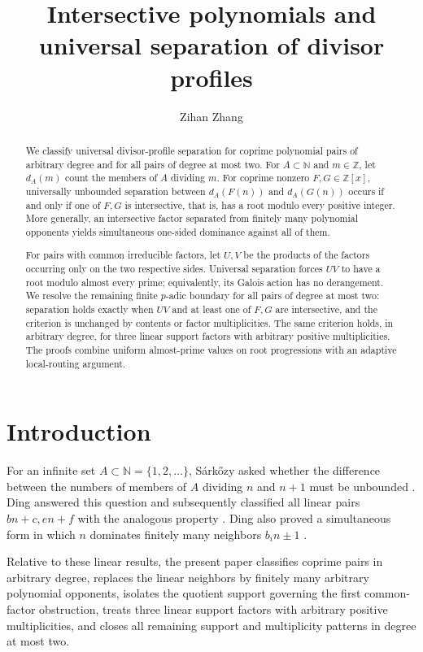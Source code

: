 \documentclass[11pt]{amsart}
\title[Universal separation of divisor profiles]{Intersective polynomials
and universal separation of divisor profiles}
\author{Zihan Zhang}
\newcommand{\N}{\mathbb N}
\newcommand{\Z}{\mathbb Z}
\theoremstyle{definition}
\begin{document}
\begin{abstract}
We classify universal divisor-profile separation for coprime polynomial pairs
of arbitrary degree and for all pairs of degree at most two.  For
\(A\subset\N\) and \(m\in\Z\), let \(d_A(m)\) count the members of \(A\)
dividing \(m\).  For coprime nonzero \(F,G\in\Z[x]\), universally unbounded
separation between \(d_A(F(n))\) and \(d_A(G(n))\) occurs if and only if one
of \(F,G\) is intersective, that is, has a root modulo every positive integer.
More generally, an intersective factor separated from finitely many polynomial
opponents yields simultaneous one-sided dominance against all of them.

For pairs with common irreducible factors, let \(U,V\) be the products of
the factors occurring only on the two respective sides.  Universal
separation forces \(UV\) to have a root modulo almost every prime;
equivalently, its Galois action has no derangement.  We resolve the remaining
finite \(p\)-adic boundary for all pairs of degree at most two: separation
holds exactly when \(UV\) and at least one of \(F,G\) are intersective, and
the criterion is unchanged by contents or factor multiplicities.  The same
criterion holds, in arbitrary degree, for three linear support factors with
arbitrary positive multiplicities.  The proofs combine uniform almost-prime
values on root progressions with an adaptive local-routing argument.
\end{abstract}

\maketitle

\section{Introduction}

For an infinite set \(A\subset\N=\{1,2,\ldots\}\), S\'ark\H{o}zy asked
whether the difference between the numbers of members of \(A\) dividing
\(n\) and \(n+1\) must be unbounded
\cite{Sarkozy2001}.  Ding answered this question and subsequently classified
all linear pairs \(bn+c,en+f\) with the analogous property
\cite{DingLinear}.  Ding also proved a simultaneous form in which \(n\)
dominates finitely many neighbors \(b_i n\pm1\)
\cite{DingProblem26}.

Relative to these linear results, the present paper classifies coprime pairs
in arbitrary degree, replaces the linear neighbors by finitely many arbitrary
polynomial opponents, isolates the quotient support governing the first
common-factor obstruction, treats three linear support factors with arbitrary
positive multiplicities, and closes all remaining support and multiplicity
patterns in degree at most two.
\end{document}
